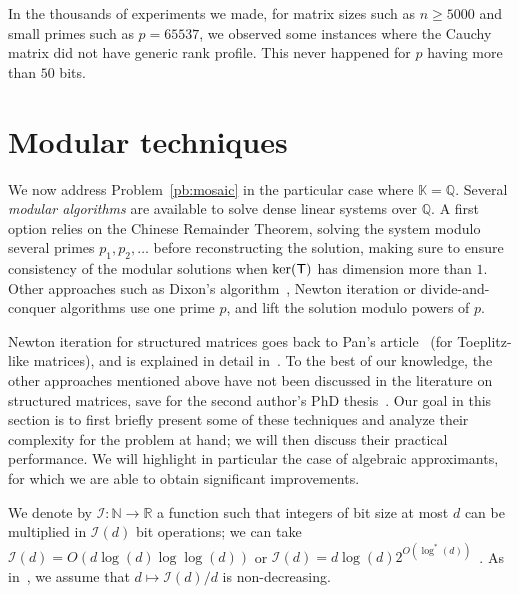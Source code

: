 \documentclass[sigconf]{acmart}
\newcommand{\mT}{\ensuremath{\mathsf{T}}}
\newcommand{\K}{\ensuremath{\mathbb{K}}}
\newcommand{\Q}{\ensuremath{\mathbb{Q}}}
\theoremstyle{acmdefinition}
\begin{document}
In the thousands of experiments we made, for matrix
sizes such as $n \ge 5000$ and small primes such as $p=65537$, we
observed some instances where the Cauchy matrix did not have generic
rank profile. This never happened for $p$ having more than $50$ bits.


\vspace{-5px}
\section{Modular techniques}\label{sec:lifting}

We now address Problem~\ref{pb:mosaic} in the particular case where
$\K=\Q$. Several {\em modular algorithms} are available to solve dense
linear systems over $\Q$. A first option relies on the Chinese
Remainder Theorem, solving the system modulo several primes
$p_1,p_2,\dots$ before reconstructing the solution, making sure to
ensure consistency of the modular solutions when ${\rm ker}(\mT)$ has
dimension more than $1$. Other approaches such as Dixon's
algorithm~\cite{Dixon82}, Newton iteration or divide-and-conquer
algorithms use one prime $p$, and lift the solution modulo powers of
$p$.

Newton iteration for structured matrices goes back to Pan's
article~\cite{Pan92} (for Toeplitz-like matrices), and is explained in
detail in~\cite[Chapter~7]{Pan01}. To the best of our knowledge, the
other approaches mentioned above have not been discussed in the
literature on structured matrices, save for the second author's PhD
thesis~\cite{Lebreton12}. Our goal in this section is to first
briefly present some of these techniques and analyze their complexity
for the problem at hand; we will then discuss their practical
performance. We will highlight in particular the case of algebraic
approximants, for which we are able to obtain significant
improvements.

We denote by $\mathscr{I}:\mathbb{N} \to \mathbb{R}$ a function such
that integers of bit size at most $d$ can be multiplied in
$\mathscr{I}(d)$ bit operations; we can take $\mathscr{I}(d)=O(d
\log(d) \log\log(d))$ or $\mathscr{I}(d)=d \log(d)
2^{O(\log^*(d))}$~\cite{ScSt71,Furer07}. As in~\cite{GaGe13}, we
assume that $d\mapsto \mathscr{I}(d)/d$ is non-decreasing.

\end{document}
